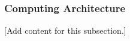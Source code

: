 
\subsubsection{Computing Architecture}
\label{subsubsec:design_2_4_1_computing_architecture}

[Add content for this subsection.]
